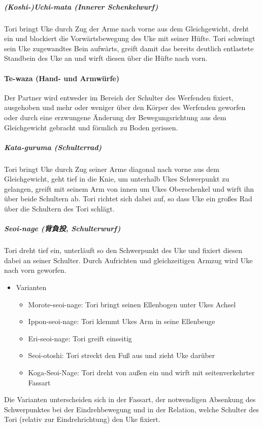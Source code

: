 \documentclass[justified, a4paper, notitlepage, captions=tableheading, nobib]{tufte-handout}
\begin{document}
\subparagraph{(Koshi-)Uchi-mata (Innerer Schenkelwurf)}
\label{sec:orgcbab12e}
Tori bringt Uke durch Zug der Arme nach vorne aus dem Gleichgewicht, dreht ein und blockiert die Vorwärtsbewegung des Uke mit seiner Hüfte. Tori schwingt sein Uke zugewandtes Bein aufwärts, greift damit das bereits deutlich entlastete Standbein des Uke an und wirft diesen über die Hüfte nach vorn.

\paragraph{Te-waza (Hand- und Armwürfe) }
\label{sec:org3f2283c}
Der Partner wird entweder im Bereich der Schulter des Werfenden fixiert, ausgehoben und mehr oder weniger über den Körper des Werfenden geworfen oder durch eine erzwungene Änderung der Bewegungsrichtung aus dem Gleichgewicht gebracht und förmlich zu Boden gerissen.

\subparagraph{Kata-guruma (Schulterrad)}
\label{sec:orgd122590}
Tori bringt Uke durch Zug seiner Arme diagonal nach vorne aus dem Gleichgewicht, geht tief in die Knie, um unterhalb Ukes Schwerpunkt zu gelangen, greift mit seinem Arm von innen um Ukes Oberschenkel und wirft ihn über beide Schultern ab. Tori richtet sich dabei auf, so dass Uke ein großes Rad über die Schultern des Tori schlägt.

\subparagraph{Seoi-nage (背負投, Schulterwurf)}
\label{sec:org461a848}
Tori dreht tief ein, unterläuft so den Schwerpunkt des Uke und fixiert diesen dabei an seiner Schulter. Durch Aufrichten und gleichzeitigen Armzug wird Uke nach vorn geworfen.

\begin{itemize}
\item Varianten
\begin{itemize}
\item Morote-seoi-nage: Tori bringt seinen Ellenbogen unter Ukes Achsel
\item Ippon-seoi-nage: Tori klemmt Ukes Arm in seine Ellenbeuge
\item Eri-seoi-nage: Tori greift einseitig
\item Seoi-otoshi: Tori streckt den Fuß aus und zieht Uke darüber
\item Koga-Seoi-Nage: Tori dreht von außen ein und wirft mit seitenverkehrter Fassart
\end{itemize}
\end{itemize}

Die Varianten unterscheiden sich in der Fassart, der notwendigen Absenkung des Schwerpunktes bei der Eindrehbewegung und in der Relation, welche Schulter des Tori (relativ zur Eindrehrichtung) den Uke fixiert.
\end{document}
